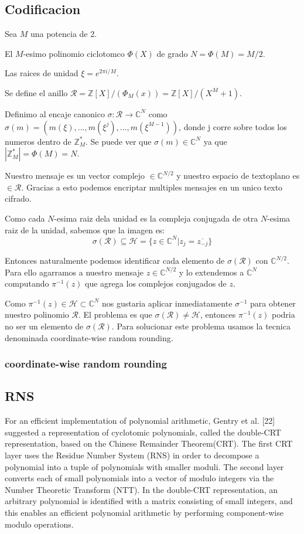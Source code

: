 \documentclass[12pt, oneside]{article}
\newcommand{\Hc}{\mathcal{H}}
\newcommand{\Rc}{\mathcal{R}}
\newcommand{\C}{\mathbb{C}}
\newcommand{\Z}{\mathbb{Z}}
\begin{document}
\subsection{Codificacion}
Sea $M$ una potencia de 2.

El $M$-esimo polinomio ciclotomco $\Phi(X)$ de grado $N=\Phi(M)=M/2$.

Las raices de unidad $\xi=e^{2\pi i/M}$.

Se define el anillo $\Rc=\Z[X]/(\Phi_M(x))=\Z[X]/(X^M+1)$.

Definimo al encaje canonico $\sigma: \Rc\to\C^N$ como
$\sigma(m)=(m(\xi),...,m(\xi^j),...,m(\xi^{M-1}))$, donde j corre sobre todos los
numeros dentro de $\Z^*_M$.
Se puede ver que $\sigma(m)\in\C^N$ ya que $|\Z^*_M|=\Phi(M)=N$.

Nuestro mensaje es un vector complejo $\in\C^{N/2}$ y nuestro espacio de textoplano
es $\in\Rc$.
Gracias a esto podemos encriptar multiples mensajes en un unico texto cifrado.

Como cada $N$-esima raiz dela unidad es la compleja conjugada de otra
$N$-esima raiz de la unidad, sabemos que la imagen es:
\begin{equation*}
\sigma(\Rc)\subseteq\Hc=\{z\in\C^N|z_j=\overline{z_{-j}}\}
\end{equation*}

Entonces naturalmente podemos identificar cada elemento de $\sigma(\Rc)$ con $\C^{N/2}$.
Para ello agarramos a nuestro mensaje $z\in\C^{N/2}$ y lo extendemos a $\C^N$ computando
$\pi^{-1}(z)$ que agrega los complejos conjugados de $z$.

Como $\pi^{-1}(z)\in\Hc\subset\C^N$ nos gustaria aplicar inmediatamente $\sigma^{-1}$ para obtener nuestro
polinomio $\Rc$.
El problema es que $\sigma(\Rc)\neq\Hc$, entonces $\pi^{-1}(z)$ podria no ser un elemento de
$\sigma(\Rc)$.
Para solucionar este problema usamos la tecnica denominada coordinate-wise random rounding.
\subsubsection*{coordinate-wise random rounding}

\subsection{RNS}
For an efficient implementation of polynomial arithmetic, Gentry et al. [22]
suggested a representation of cyclotomic polynomials, called the double-CRT representation,
based on the Chinese Remainder Theorem(CRT).
The first CRT layer uses the Residue Number System (RNS) in order to decompose a
polynomial into a tuple of polynomials with smaller moduli.
The second layer converts each of small polynomials into a vector of modulo integers
via the Number Theoretic Transform (NTT).
In the double-CRT representation, an arbitrary polynomial is identified with a
matrix consisting of small integers, and this enables an efficient polynomial arithmetic
by performing component-wise modulo operations.
\end{document}
